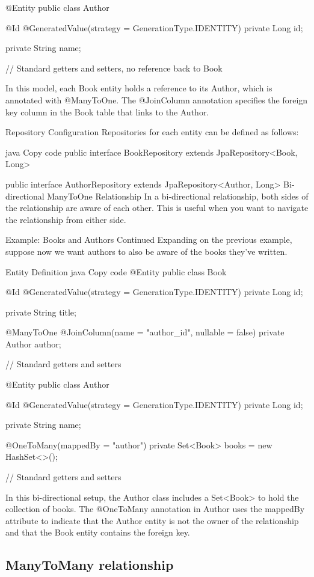 @Entity
public class Author {
    @Id
    @GeneratedValue(strategy = GenerationType.IDENTITY)
    private Long id;

    private String name;

    // Standard getters and setters, no reference back to Book
}
In this model, each Book entity holds a reference to its Author, which is annotated with @ManyToOne. The @JoinColumn annotation specifies the foreign key column in the Book table that links to the Author.

Repository Configuration
Repositories for each entity can be defined as follows:

java
Copy code
public interface BookRepository extends JpaRepository<Book, Long> {
}

public interface AuthorRepository extends JpaRepository<Author, Long> {
}
Bi-directional ManyToOne Relationship
In a bi-directional relationship, both sides of the relationship are aware of each other. This is useful when you want to navigate the relationship from either side.

Example: Books and Authors Continued
Expanding on the previous example, suppose now we want authors to also be aware of the books they've written.

Entity Definition
java
Copy code
@Entity
public class Book {
    @Id
    @GeneratedValue(strategy = GenerationType.IDENTITY)
    private Long id;

    private String title;

    @ManyToOne
    @JoinColumn(name = "author_id", nullable = false)
    private Author author;

    // Standard getters and setters
}

@Entity
public class Author {
    @Id
    @GeneratedValue(strategy = GenerationType.IDENTITY)
    private Long id;

    private String name;

    @OneToMany(mappedBy = "author")
    private Set<Book> books = new HashSet<>();

    // Standard getters and setters
}
In this bi-directional setup, the Author class includes a Set<Book> to hold the collection of books. The @OneToMany annotation in Author uses the mappedBy attribute to indicate that the Author entity is not the owner of the relationship and that the Book entity contains the foreign key.

\subsection{ManyToMany relationship}


